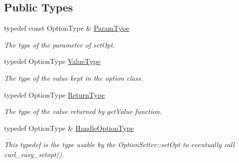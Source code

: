 \subsection*{Public Types}
\begin{DoxyCompactItemize}
\item 
\hypertarget{structcurlpp_1_1internal_1_1OptionContainerType_add40212a613a62a6c6eed6a2ad94266e}{typedef const Option\-Type \& \hyperlink{structcurlpp_1_1internal_1_1OptionContainerType_add40212a613a62a6c6eed6a2ad94266e}{Param\-Type}}\label{structcurlpp_1_1internal_1_1OptionContainerType_add40212a613a62a6c6eed6a2ad94266e}

\begin{DoxyCompactList}\small\item\em The type of the parameter of set\-Opt. \end{DoxyCompactList}\item 
\hypertarget{structcurlpp_1_1internal_1_1OptionContainerType_ac0dfc2603e86927126613f64fc49e052}{typedef Option\-Type \hyperlink{structcurlpp_1_1internal_1_1OptionContainerType_ac0dfc2603e86927126613f64fc49e052}{Value\-Type}}\label{structcurlpp_1_1internal_1_1OptionContainerType_ac0dfc2603e86927126613f64fc49e052}

\begin{DoxyCompactList}\small\item\em The type of the value kept in the option class. \end{DoxyCompactList}\item 
\hypertarget{structcurlpp_1_1internal_1_1OptionContainerType_ac835f18c629e47a072b66a5c9fba4e36}{typedef Option\-Type \hyperlink{structcurlpp_1_1internal_1_1OptionContainerType_ac835f18c629e47a072b66a5c9fba4e36}{Return\-Type}}\label{structcurlpp_1_1internal_1_1OptionContainerType_ac835f18c629e47a072b66a5c9fba4e36}

\begin{DoxyCompactList}\small\item\em The type of the value returned by get\-Value function. \end{DoxyCompactList}\item 
\hypertarget{structcurlpp_1_1internal_1_1OptionContainerType_a9759c6ed8e831847dcad8426a4783f39}{typedef Option\-Type \& \hyperlink{structcurlpp_1_1internal_1_1OptionContainerType_a9759c6ed8e831847dcad8426a4783f39}{Handle\-Option\-Type}}\label{structcurlpp_1_1internal_1_1OptionContainerType_a9759c6ed8e831847dcad8426a4783f39}

\begin{DoxyCompactList}\small\item\em This typedef is the type usable by the Option\-Setter\-::set\-Opt to eventually call curl\-\_\-easy\-\_\-setopt(). \end{DoxyCompactList}\end{DoxyCompactItemize}


